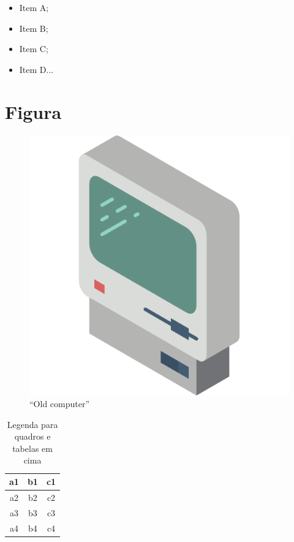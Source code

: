 \begin{itemize}
 \item Item A;
 \item Item B;
 \item Item C;
 \item Item D...
\end{itemize}

\section{Figura}

\begin{figure}[htb]
	\centering
    \includegraphics[scale=0.20]{assets/072-old-computer} %
	\caption{``Old computer''} 
\end{figure}

\begin{table}[htb]
\caption{Legenda para quadros e tabelas em cima}
\begin{tabular}{|c|c|c|}
\hline
a1 & b1 & c1 \\ \hline
a2 & b2 & c2 \\ \hline
a3 & b3 & c3 \\ \hline
a4 & b4 & c4 \\ \hline
\end{tabular}
\end{table}

